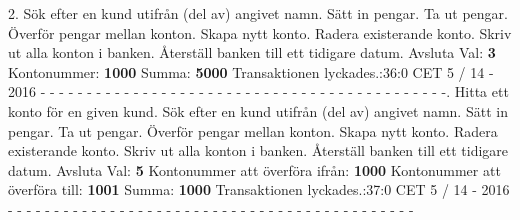 2.   Sök efter en kund utifrån (del av) angivet namn.   Sätt in pengar.   Ta ut pengar.   Överför pengar mellan konton.   Skapa nytt konto.   Radera existerande konto.   Skriv ut alla konton i banken.   Återställ banken till ett tidigare datum. Avsluta\newline
Val: \textbf{3}\newline
Kontonummer: \textbf{1000}\newline
Summa: \textbf{5000}\newline
Transaktionen lyckades.:36:0 CET 5 / 14 - 2016\newline
\newline
- - - - - - - - - - - - - - - - - - - - - - - - - - - - - - - - - - - - - - - - - - - -.   Hitta ett konto för en given kund.   Sök efter en kund utifrån (del av) angivet namn.   Sätt in pengar.   Ta ut pengar.   Överför pengar mellan konton.   Skapa nytt konto.   Radera existerande konto.   Skriv ut alla konton i banken.   Återställ banken till ett tidigare datum. Avsluta\newline
Val: \textbf{5}\newline
Kontonummer att överföra ifrån: \textbf{1000}\newline
Kontonummer att överföra till: \textbf{1001}\newline
Summa: \textbf{1000}\newline
Transaktionen lyckades.:37:0 CET 5 / 14 - 2016\newline
\newline
- - - - - - - - - - - - - - - - - - - - - - - - - - - - - - - - - - - - - - - - - - - -\newline
